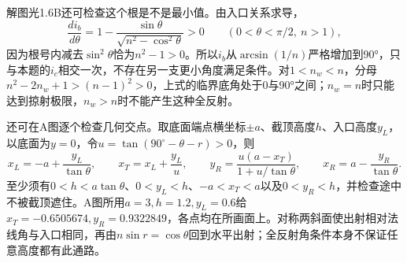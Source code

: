 \documentclass[UTF8,fontset=fandol,a4paper,11pt]{ctexart}
\begin{document}
解图光1.6B还可检查这个根是不是最小值。由入口关系求导，
\[
\frac{di_b}{d\theta}
=1-\frac{\sin\theta}{\sqrt{n^2-\cos^2\theta}}>0
\qquad(0<\theta<\pi/2,\ n>1),
\]
因为根号内减去$\sin^2\theta$恰为$n^2-1>0$。所以$i_b$从$\arcsin(1/n)$严格增加到90°，只与本题的$i_c$相交一次，不存在另一支更小角度满足条件。对$1<n_w<n$，分母$n^2-2n_w+1>(n-1)^2>0$，上式的临界底角处于0与90°之间；$n_w=n$时只能达到掠射极限，$n_w>n$时不能产生这种全反射。

还可在A图逐个检查几何交点。取底面端点横坐标$\pm a$、截顶高度$h$、入口高度$y_L$，以底面为$y=0$，令$u=\tan(90^\circ-\theta-r)>0$，则
\[
x_L=-a+\frac{y_L}{\tan\theta},\qquad
x_T=x_L+\frac{y_L}{u},\qquad
y_R=\frac{u(a-x_T)}{1+u/\tan\theta},\qquad
x_R=a-\frac{y_R}{\tan\theta}.
\]
至少须有$0<h<a\tan\theta$、$0<y_L<h$、$-a<x_T<a$以及$0<y_R<h$，并检查途中不被截顶遮住。A图所用$a=3,h=1.2,y_L=0.6$给$x_T=-0.6505674,y_R=0.9322849$，各点均在所画面上。对称两斜面使出射相对法线角与入口相同，再由$n\sin r=\cos\theta$回到水平出射；全反射角条件本身不保证任意高度都有此通路。
\end{document}
